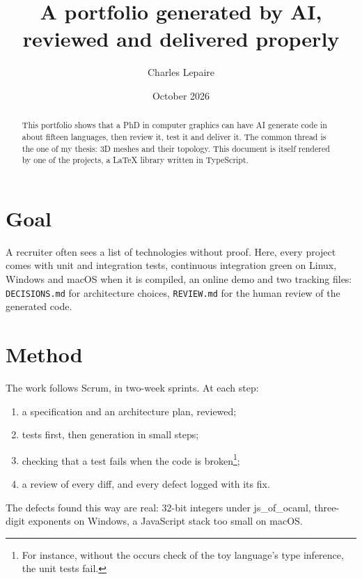 \documentclass{article}
\title{A portfolio generated by AI, reviewed and delivered properly}
\author{Charles Lepaire}
\date{October 2026}
\begin{document}
\maketitle

\begin{abstract}
This portfolio shows that a PhD in computer graphics can have AI generate code in about fifteen
languages, then review it, test it and deliver it. The common thread is the one of my thesis: 3D
meshes and their topology. This document is itself rendered by one of the projects, a \LaTeX{}
library written in TypeScript.
\end{abstract}

\tableofcontents

\section{Goal}\label{sec:goal}
A recruiter often sees a list of technologies without proof. Here, every project comes with unit and
integration tests, continuous integration green on Linux, Windows and macOS when it is compiled, an
online demo and two tracking files: \texttt{DECISIONS.md} for architecture choices, \texttt{REVIEW.md}
for the human review of the generated code.

\section{Method}\label{sec:method}
The work follows Scrum, in two-week sprints. At each step:
\begin{enumerate}
\item a specification and an architecture plan, reviewed;
\item tests first, then generation in small steps;
\item checking that a test fails when the code is broken\footnote{For instance, without the occurs
check of the toy language's type inference, the unit tests fail.};
\item a review of every diff, and every defect logged with its fix.
\end{enumerate}
The defects found this way are real: 32-bit integers under js\_of\_ocaml, three-digit exponents on
Windows, a JavaScript stack too small on macOS.
\end{document}

